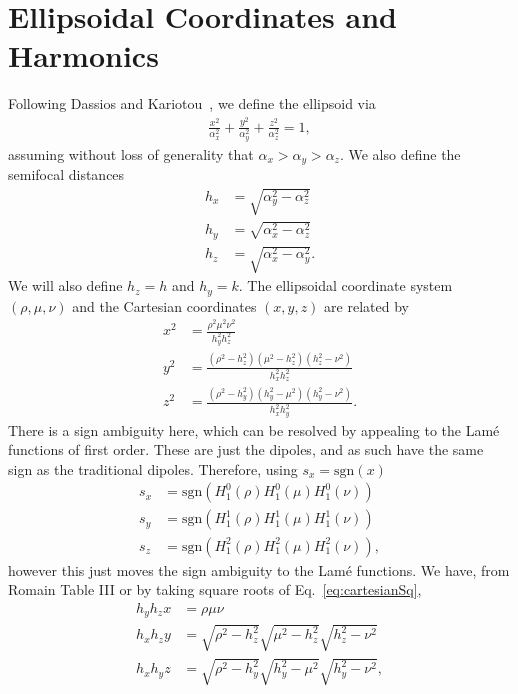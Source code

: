\section{Ellipsoidal Coordinates and Harmonics}
Following Dassios and Kariotou~\cite{Dassios03}, we define the
ellipsoid via
\begin{align}
  \frac{x^2}{\alpha_x^2} +   \frac{y^2}{\alpha_y^2} +   \frac{z^2}{\alpha_z^2} = 1,
  \end{align}
assuming without loss of generality that $\alpha_x > \alpha_y >
\alpha_z$.  We also define the semifocal distances
\begin{align}
  h_x &= \sqrt{\alpha_y^2-\alpha_z^2}\\
  h_y &= \sqrt{\alpha_x^2-\alpha_z^2}\\
  h_z &= \sqrt{\alpha_x^2-\alpha_y^2}.
\end{align}
We will also define $h_z = h$ and $h_y = k$.
The ellipsoidal coordinate system $(\rho, \mu, \nu)$ and the Cartesian
coordinates $(x, y, z)$ are related by
\begin{align}\label{eq:cartesianSq}
  x^2 &= \frac{\rho^2 \mu^2 \nu^2}{h^2_y h^2_z} \\
  y^2 &= \frac{(\rho^2 - h^2_z)(\mu^2 - h^2_z)(h^2_z - \nu^2)}{h^2_x h^2_z} \\
  z^2 &= \frac{(\rho^2 - h^2_y)(h^2_y - \mu^2)(h^2_y - \nu^2)}{h^2_x h^2_y}.
\end{align}
There is a sign ambiguity here, which can be resolved by appealing to the Lam\'e functions of first order. These are
just the dipoles, and as such have the same sign as the traditional dipoles. Therefore, using $s_x = \mathrm{sgn}(x)$
\begin{align}
  s_x &= \mathrm{sgn}\left(H^0_1(\rho) H^0_1(\mu) H^0_1(\nu)\right) \\
  s_y &= \mathrm{sgn}\left(H^1_1(\rho) H^1_1(\mu) H^1_1(\nu)\right) \\
  s_z &= \mathrm{sgn}\left(H^2_1(\rho) H^2_1(\mu) H^2_1(\nu)\right),
\end{align}
however this just moves the sign ambiguity to the Lam\'e functions. We have, from Romain Table III or by taking square
roots of Eq.~\ref{eq:cartesianSq},
\begin{align}
  h_y h_z x &= \rho \mu \nu \\
  h_x h_z y &= \sqrt{\rho^2 - h^2_z} \sqrt{\mu^2 - h^2_z} \sqrt{h^2_z - \nu^2} \\
  h_x h_y z &= \sqrt{\rho^2 - h^2_y} \sqrt{h^2_y - \mu^2} \sqrt{h^2_y - \nu^2},
\end{align}
